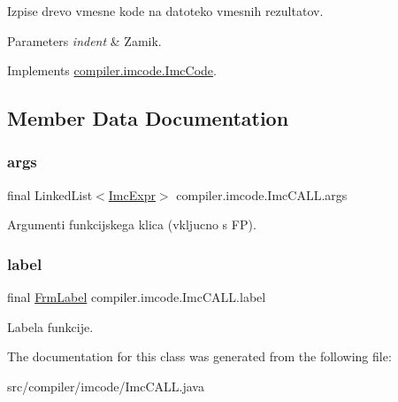 Izpise drevo vmesne kode na datoteko vmesnih rezultatov.


\begin{DoxyParams}{Parameters}
{\em indent} & Zamik. \\
\hline
\end{DoxyParams}


Implements \hyperlink{interfacecompiler_1_1imcode_1_1_imc_code_a26451dea2ab4dbd7054ac33f4c6d71fe}{compiler.\+imcode.\+Imc\+Code}.



\subsection{Member Data Documentation}
\mbox{\label{classcompiler_1_1imcode_1_1_imc_c_a_l_l_a3c7bcbe1544af8a07454f3ce580856c0}} 
\subsubsection{\texorpdfstring{args}{args}}
{\footnotesize\ttfamily final Linked\+List$<$\hyperlink{classcompiler_1_1imcode_1_1_imc_expr}{Imc\+Expr}$>$ compiler.\+imcode.\+Imc\+C\+A\+L\+L.\+args}

Argumenti funkcijskega klica (vkljucno s FP). \mbox{\label{classcompiler_1_1imcode_1_1_imc_c_a_l_l_aa763ad3e64c6ef18e846d2fcb87959ef}} 
\subsubsection{\texorpdfstring{label}{label}}
{\footnotesize\ttfamily final \hyperlink{classcompiler_1_1frames_1_1_frm_label}{Frm\+Label} compiler.\+imcode.\+Imc\+C\+A\+L\+L.\+label}

Labela funkcije. 

The documentation for this class was generated from the following file\+:\begin{DoxyCompactItemize}
\item 
src/compiler/imcode/Imc\+C\+A\+L\+L.\+java\end{DoxyCompactItemize}
